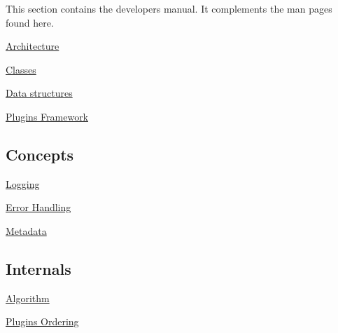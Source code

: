 This section contains the developer\textquotesingle{}s manual. It complements the man pages found here.


\begin{DoxyItemize}
\item \hyperlink{doc_dev_architecture_md}{Architecture}
\item \hyperlink{doc_dev_classes_md}{Classes}
\item \hyperlink{doc_dev_data-structures_md}{Data structures}
\item \hyperlink{doc_dev_plugins-framework_md}{Plugins Framework}
\end{DoxyItemize}

\subsection*{Concepts}


\begin{DoxyItemize}
\item \hyperlink{doc_dev_logging_md}{Logging}
\item \hyperlink{doc_dev_error-handling_md}{Error Handling}
\item \hyperlink{doc_dev_metadata_md}{Metadata}
\end{DoxyItemize}

\subsection*{Internals}


\begin{DoxyItemize}
\item \hyperlink{doc_dev_algorithm_md}{Algorithm}
\item \hyperlink{doc_dev_plugins-ordering_md}{Plugins Ordering} 
\end{DoxyItemize}
